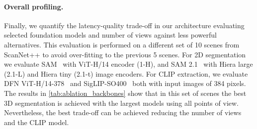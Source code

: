 \paragraph{Overall profiling.} 
Finally, we quantify the latency-quality trade-off in our architecture evaluating selected foundation models and number of views against less powerful alternatives.
This evaluation is performed on a different set of 10 scenes from ScanNet++ to avoid over-fitting to the previous 5 scenes.
For 2D segmentation we evaluate SAM~\cite{kirillov2023sam} with ViT-H/14 encoder (1-H), and SAM 2.1~\cite{ravi2024sam2} with Hiera large (2.1-L) and Hiera tiny (2.1-t) image encoders. 
For CLIP extraction, we evaluate DFN ViT-H/14-378~\cite{data-filtering-networks} and SigLIP-SO400~\cite{zhai2023siglip} both with input images of 384 pixels.
The results in \cref{tab:ablation_backbones} show that in this set of scenes the best 3D segmentation is achieved with the largest models using all points of view.
Nevertheless, the best trade-off can be achieved reducing the number of views and the CLIP model.

